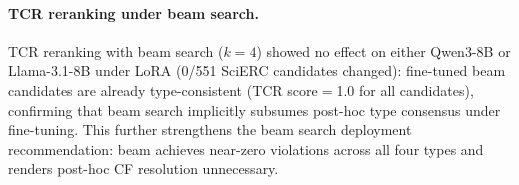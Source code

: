 \paragraph{TCR reranking under beam search.}
TCR reranking with beam search ($k{=}4$) showed no effect on either Qwen3-8B or Llama-3.1-8B under LoRA (0/551 SciERC candidates changed): fine-tuned beam candidates are already type-consistent (TCR score${=}$1.0 for all candidates), confirming that beam search implicitly subsumes post-hoc type consensus under fine-tuning.
This further strengthens the beam search deployment recommendation: beam achieves near-zero violations across all four types and renders post-hoc CF resolution unnecessary.
